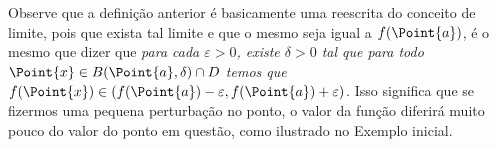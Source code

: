 \begin{remark}{}{}
Observe que a definição anterior é basicamente uma reescrita do conceito de limite, pois que exista tal limite e que o mesmo seja igual a $f(\Point{a})$, é o mesmo que dizer que \textit{para cada \(\varepsilon > 0\), existe \(\delta > 0\) tal que para todo \(\Point{x} \in B(\Point{a},\delta)\cap D\) temos que %
$f(\Point{x})\in (f(\Point{a})-\varepsilon, f(\Point{a})+\varepsilon)$.}
Isso significa que se fizermos uma pequena perturbação no ponto, o valor da função diferirá muito pouco do valor do ponto em questão, como ilustrado no Exemplo %
inicial.

\end{remark}





